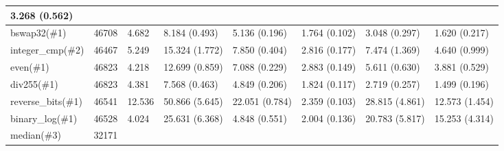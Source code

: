 \begin{table*}[]
\begin{tabular}{@{}llllllll@{}}
										\multicolumn{1}{l}{3.268 (0.562)} \\ \midrule
										\multicolumn{1}{l}{bswap32(\#1)} &
										\multicolumn{1}{l}{46708} &
										\multicolumn{1}{l}{4.682} &
										\multicolumn{1}{l}{8.184 (0.493)} &
										\multicolumn{1}{l}{5.136 (0.196)} &
										\multicolumn{1}{l}{1.764 (0.102)} &
										\multicolumn{1}{l}{3.048 (0.297)} &
										\multicolumn{1}{l}{1.620 (0.217)} \\ \midrule
										\multicolumn{1}{l}{integer\_cmp(\#2)} &
										\multicolumn{1}{l}{46467} &
										\multicolumn{1}{l}{5.249} &
										\multicolumn{1}{l}{15.324 (1.772)} &
										\multicolumn{1}{l}{7.850 (0.404)} &
										\multicolumn{1}{l}{2.816 (0.177)} &
										\multicolumn{1}{l}{7.474 (1.369)} &
										\multicolumn{1}{l}{4.640 (0.999)} \\ \midrule
										\multicolumn{1}{l}{even(\#1)} &
										\multicolumn{1}{l}{46823} &
										\multicolumn{1}{l}{4.218} &
										\multicolumn{1}{l}{12.699 (0.859)} &
										\multicolumn{1}{l}{7.088 (0.229)} &
										\multicolumn{1}{l}{2.883 (0.149)} &
										\multicolumn{1}{l}{5.611 (0.630)} &
										\multicolumn{1}{l}{3.881 (0.529)} \\ \midrule
										\multicolumn{1}{l}{div255(\#1)} &
										\multicolumn{1}{l}{46823} &
										\multicolumn{1}{l}{4.381} &
										\multicolumn{1}{l}{7.568 (0.463)} &
										\multicolumn{1}{l}{4.849 (0.206)} &
										\multicolumn{1}{l}{1.824 (0.117)} &
										\multicolumn{1}{l}{2.719 (0.257)} &
										\multicolumn{1}{l}{1.499 (0.196)} \\ \midrule
										\multicolumn{1}{l}{reverse\_bits(\#1)} &
										\multicolumn{1}{l}{46541} &
										\multicolumn{1}{l}{12.536} &
										\multicolumn{1}{l}{50.866 (5.645)} &
										\multicolumn{1}{l}{22.051 (0.784)} &
										\multicolumn{1}{l}{2.359 (0.103)} &
										\multicolumn{1}{l}{28.815 (4.861)} &
										\multicolumn{1}{l}{12.573 (1.454)} \\ \midrule
										\multicolumn{1}{l}{binary\_log(\#1)} &
										\multicolumn{1}{l}{46528} &
										\multicolumn{1}{l}{4.024} &
										\multicolumn{1}{l}{25.631 (6.368)} &
										\multicolumn{1}{l}{4.848 (0.551)} &
										\multicolumn{1}{l}{2.004 (0.136)} &
										\multicolumn{1}{l}{20.783 (5.817)} &
										\multicolumn{1}{l}{15.253 (4.314)} \\ \midrule
										\multicolumn{1}{l}{median(\#3)} &
										\multicolumn{1}{l}{32171} &

\end{tabular}
\end{table*}
